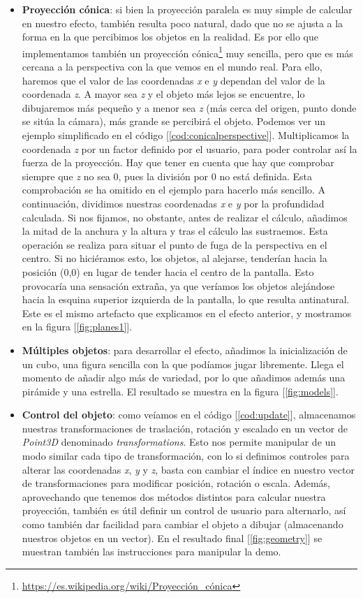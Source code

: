\begin{itemize}
	\item \textbf{Proyección cónica}: si bien la proyección paralela es muy simple de calcular en nuestro efecto, también resulta poco natural, dado que no se ajusta a la forma en la que percibimos los objetos en la realidad. Es por ello que implementamos también un proyección cónica\footnote{\url{https://es.wikipedia.org/wiki/Proyección_cónica}} muy sencilla, pero que es más cercana a la perspectiva con la que vemos en el mundo real. Para ello, haremos que el valor de las coordenadas \emph{x} e \emph{y} dependan del valor de la coordenada \emph{z}. A mayor sea \emph{z} y el objeto más lejos se encuentre, lo dibujaremos más pequeño y a menor sea \emph{z} (más cerca del origen, punto donde se sitúa la cámara), más grande se percibirá el objeto. Podemos ver un ejemplo simplificado en el código [\ref{cod:conicalperspective}]. Multiplicamos la coordenada \emph{z} por un factor definido por el usuario, para poder controlar así la fuerza de la proyección. Hay que tener en cuenta que hay que comprobar siempre que \emph{z} no sea 0, pues la división por 0 no está definida. Esta comprobación se ha omitido en el ejemplo para hacerlo más sencillo. A continuación, dividimos nuestras coordenadas \emph{x} e \emph{y} por la profundidad calculada. Si nos fijamos, no obstante, antes de realizar el cálculo, añadimos la mitad de la anchura y la altura y tras el cálculo las sustraemos. Esta operación se realiza para situar el punto de fuga de la perspectiva en el centro. Si no hiciéramos esto, los objetos, al alejarse, tenderían hacia la posición (0,0) en lugar de tender hacia el centro de la pantalla. Esto provocaría una sensación extraña, ya que veríamos los objetos alejándose hacia la esquina superior izquierda de la pantalla, lo que resulta antinatural. Este es el mismo artefacto que explicamos en el efecto anterior, y mostramos en la figura [\ref{fig:planes1}].
	\item \textbf{Múltiples objetos}: para desarrollar el efecto, añadimos la inicialización de un cubo, una figura sencilla con la que podíamos jugar libremente. Llega el momento de añadir algo más de variedad, por lo que añadimos además una pirámide y una estrella. El resultado se muestra en la figura [\ref{fig:models}].
	\item \textbf{Control del objeto}: como veíamos en el código [\ref{cod:update}], almacenamos nuestras transformaciones de traslación, rotación y escalado en un vector de \emph{Point3D} denominado \emph{transformations}. Esto nos permite manipular de un modo similar cada tipo de transformación, con lo si definimos controles para alterar las coordenadas \emph{x}, \emph{y} y \emph{z}, basta con cambiar el índice en nuestro vector de transformaciones para modificar posición, rotación o escala. Además, aprovechando que tenemos dos métodos distintos para calcular nuestra proyección, también es útil definir un control de usuario para alternarlo, así como también dar facilidad para cambiar el objeto a dibujar (almacenando nuestros objetos en un vector). En el resultado final [\ref{fig:geometry}] se muestran también las instrucciones para manipular la demo.
\end{itemize}

